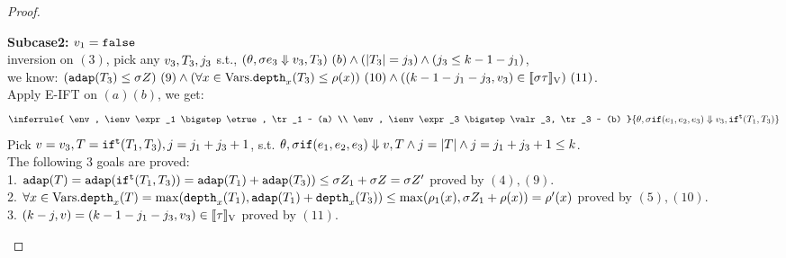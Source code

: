 \documentclass[a4paper,11pt]{article}
\theoremstyle{definition}
\begin{document}
\begin{proof}
\begin{mainitem}
{\bf Subcase2:} $v_1 = \mathtt{false}$\\
%
inversion on $(3)$, pick any $v_3, T_3, j_3$ s.t., $(\theta, \sigma e_3 \mathrel{\Downarrow} v_3, T_3) ~ (b) \land (|T_3| = j_3) \land (j_3 \leq k-1-j_1)$,\\
%
we know: $(\mathtt{adap}(T_3) \leq \sigma Z) ~(9) \land (\forall x \in
\mbox{Vars}. \mathtt{depth}_{x}(T_3) \leq \rho(x))~(10) \land ((k -1-j_1- j_3, v_3) \in [\![ \sigma \tau ]\!]_{\text{V}})~(11)$.\\
%
Apply E-IFT on $(a) (b)$, we get:
\[
  \inferrule{
    \env, \ienv \expr_1 \bigstep \etrue, \tr_1 ~ (a) \\
    \env, \ienv \expr_3 \bigstep \valr_3, \tr_3 ~ (b)
  }{
    \env, \ienv \eif(\expr_1, \expr_2, \expr_3) \bigstep \valr_3, \trift(\tr_1, \tr_3)
  }
\]
Pick $v = v_3, T = \mathtt{if}^{\mathtt{t}}(T_1, T_3), j =j_1+ j_3+1$,  s.t. $\\
%
\env, \ienv \eif(\expr_1, \expr_2, \expr_3) \bigstep \valr, \tr \land j =
\size{\tr} \land j = j_1 + j_3+1 \leq \stepiA$.\\
%
The following 3 goals are proved:\\
%
1. $\mathtt{adap}(T) = \mathtt{adap}(\mathtt{if}^{\mathtt{t}}(T_1, T_3)) = \mathtt{adap}(T_1) +
\mathtt{adap}(T_3)) \leq \sigma Z_1 + \sigma Z = \sigma Z'$  proved by $(4),(9)$.\\
%
2. $\forall x \in \mbox{Vars}. \mathtt{depth}_{x}(T) = \max(\mathtt{depth}_{x}(T_1), \mathtt{adap}(T_1) +
\mathtt{depth}_{x}(T_3)) \leq \max(\rho_1(x), \sigma Z_1 + \rho(x)) =
\rho'(x) $ proved by $(5),(10)$.\\
%
3. $(k - j, v) = (k -1 - j_1-j_3, v_3) \in
[\![ \tau ]\!]_{\text{V}} $ proved by $(11)$.\\




\end{mainitem}
\end{proof}
\end{document}
